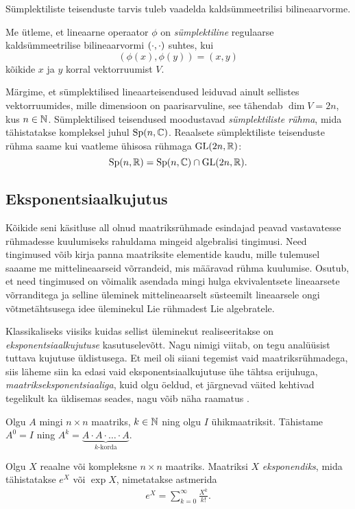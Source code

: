 Sümplektiliste teisenduste tarvis tuleb vaadelda kaldsümmeetrilisi
bilineaarvorme.

\begin{dfn}
    Me ütleme, et lineaarne operaator $\phi$ on \emph{sümplektiline}
    regulaarse kaldsümmeetrilise bilineaarvormi $\left( \cdot, \cdot \right)$ suhtes, kui
    \[ (\phi(x), \phi(y)) = (x, y) \]
    kõikide $x$ ja $y$ korral vektorruumist $V$.
\end{dfn}

Märgime, et sümplektilised lineaarteisendused leiduvad ainult sellistes
vektorruumides, mille dimensioon on paarisarvuline, see tähendab
$\dim V = 2n$, kus $n \in \mathbb{N}$. Sümplektilised teisendused moodustavad
\emph{sümplektiliste rühma}, mida tähistatakse kompleksel juhul
$\operatorname{Sp}(n, \mathbb{C})$. Reaalsete sümplektiliste
teisenduste rühma saame kui vaatleme ühisosa rühmaga $\operatorname{GL}(2n, \mathbb{R})$:
\[ \operatorname{Sp}(n, \mathbb{R}) = \operatorname{Sp}(n, \mathbb{C}) \cap \operatorname{GL}(2n, \mathbb{R}). \]


\subsection{Eksponentsiaalkujutus}

Kõikide seni käsitluse all olnud maatriksrühmade esindajad peavad
vastavatesse rühmadesse kuulumiseks rahuldama mingeid algebralisi tingimusi.
Need tingimused võib kirja panna maatriksite elementide kaudu, mille
tulemusel saaame me mittelineaarseid võrrandeid, mis määravad rühma kuulumise.
Osutub, et need tingimused on võimalik asendada mingi hulga ekvivalentsete
lineaarsete võrranditega ja selline üleminek mittelineaarselt süsteemilt
lineaarsele ongi võtmetähtsusega idee üleminekul Lie rühmadest Lie
algebratele.\cite{johan1989survey}

Klassikaliseks viisiks kuidas sellist üleminekut realiseeritakse on
\emph{eksponentsiaalkujutuse} kasutuselevõtt. Nagu nimigi viitab, on
tegu analüüsist tuttava kujutuse üldistusega. Et meil oli siiani tegemist
vaid maatriksrühmadega, siis läheme siin ka edasi vaid eksponentsiaalkujutuse
ühe tähtsa erijuhuga, \emph{maatrikseksponentsiaaliga}, kuid olgu öeldud,
et järgnevad väited kehtivad tegelikult ka üldisemas seades,
nagu võib näha raamatus \cite{kirillov2008introduction}.

Olgu $A$ mingi $n \times n$ maatriks, $k \in \mathbb{N}$ ning olgu $I$
ühikmaatriksit. Tähistame $A^0 = I$ ning
$A^k = \underbrace{A \cdot A \cdot \ldots \cdot A}_{k\text{-korda}}$.

\begin{dfn}
    Olgu $X$ reaalne või kompleksne $n \times n$ maatriks. Maatriksi
    $X$ \emph{eksponendiks}, mida tähistatakse $e^X$ või $\exp X$, nimetatakse
    astmerida
    \begin{align}\label{eq:mat-exp}
        e^X = \sum_{k=0}^{\infty} \frac{X^k}{k!}.
    \end{align}
\end{dfn}

